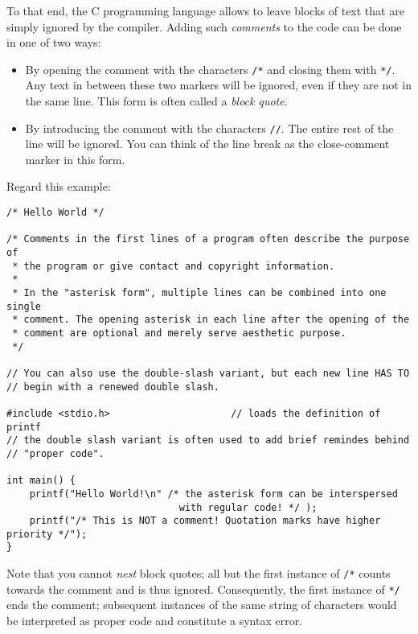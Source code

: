 To that end, the C programming language allows to leave blocks of text that are simply ignored by the compiler. Adding such \emph{comments} to the code can be done in one of two ways: \vspace{-9pt}
\begin{itemize}
\item By opening the comment with the characters \texttt{/*} and closing them with \texttt{*/}. Any text in between these two markers will be ignored, even if they are not in the same line.
	This form is often called a \emph{block quote}.
\item By introducing the comment with the characters \texttt{//}. The entire rest of the line will be ignored. You can think of the line break as the close-comment marker in this form.
\end{itemize}

Regard this example:
\begin{codebox}[helloworld.c]
\begin{verbatim}
/* Hello World */

/* Comments in the first lines of a program often describe the purpose of
 * the program or give contact and copyright information.
 *
 * In the "asterisk form", multiple lines can be combined into one single 
 * comment. The opening asterisk in each line after the opening of the
 * comment are optional and merely serve aesthetic purpose.
 */

// You can also use the double-slash variant, but each new line HAS TO 
// begin with a renewed double slash.

#include <stdio.h>                     // loads the definition of printf
// the double slash variant is often used to add brief remindes behind
// "proper code".

int main() {
    printf("Hello World!\n" /* the asterisk form can be interspersed
                              with regular code! */ );
    printf("/* This is NOT a comment! Quotation marks have higher priority */");
}
\end{verbatim}
 \label{code:comments}
\end{codebox}

Note that you cannot \emph{nest} block quotes; all but the first instance of \texttt{/*} counts towards the comment and is thus ignored. Consequently, the first instance of \texttt{*/} ends the comment; subsequent instances of the same string of characters would be interpreted as proper code and constitute a syntax error.

